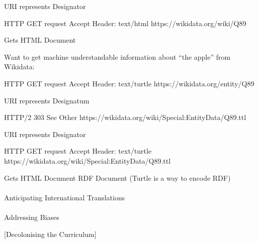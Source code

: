 \documentclass[
  british,
]{article}
\makeatletter
\let\oldparagraph\paragraph
\renewcommand{\paragraph}{
    \@ifstar
      \xxxParagraphStar
      \xxxParagraphNoStar
  }
\newcommand{\xxxParagraphStar}[1]{\oldparagraph*{#1}\mbox{}}
\newcommand{\xxxParagraphNoStar}[1]{\oldparagraph{#1}\mbox{}}
\newenvironment{Shaded}{\begin{snugshade}}{\end{snugshade}}
\newcommand{\NormalTok}[1]{\textcolor[rgb]{0.00,0.23,0.31}{#1}}
\makeatother
\begin{document}
URI represents Designator

\begin{Shaded}
\begin{Highlighting}[]
\NormalTok{HTTP GET request}
\NormalTok{Accept Header: text/html}
\NormalTok{https://wikidata.org/wiki/Q89}
\end{Highlighting}
\end{Shaded}

Gets HTML Document

Want to get machine understandable information about ``the apple'' from
Wikidata:

\begin{Shaded}
\begin{Highlighting}[]
\NormalTok{HTTP GET request}
\NormalTok{Accept Header: text/turtle}
\NormalTok{https://wikidata.org/entity/Q89}
\end{Highlighting}
\end{Shaded}

URI represents Designatum

\begin{Shaded}
\begin{Highlighting}[]
\NormalTok{HTTP/2 303 See Other}
\NormalTok{https://wikidata.org/wiki/Special:EntityData/Q89.ttl}
\end{Highlighting}
\end{Shaded}

URI represents Designator

\begin{Shaded}
\begin{Highlighting}[]
\NormalTok{HTTP GET request}
\NormalTok{Accept Header: text/turtle}
\NormalTok{https://wikidata.org/wiki/Special:EntityData/Q89.ttl}
\end{Highlighting}
\end{Shaded}

Gets HTML Document RDF Document (Turtle is a way to encode RDF)

\paragraph{Anticipating International
Translations}\label{anticipating-international-translations}

\paragraph{Addressing Biases}\label{addressing-biases}

{[}Decolonising the Curriculum{]}
\end{document}
